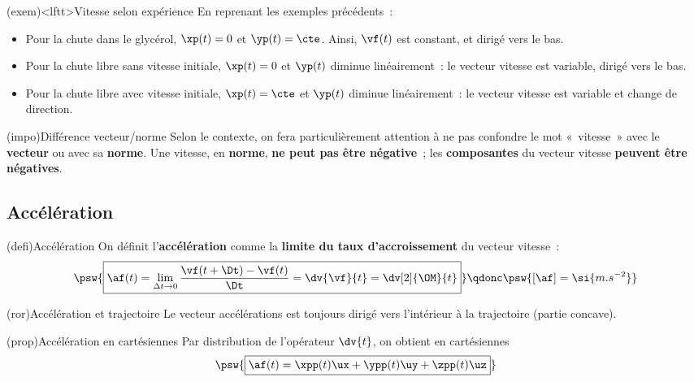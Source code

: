 \documentclass[../../main/main.tex]{subfiles}
\begin{document}
\begin{tcb}(exem)<lftt>{Vitesse selon expérience}
	En reprenant les exemples précédents~:
	\begin{itemize}
		\item Pour la chute dans le glycérol, $\xp(t) = 0$ et $\yp(t) = \cte$. Ainsi,
		      $\vf(t)$ est constant, et dirigé vers le bas.
		\item Pour la chute libre sans vitesse initiale, $\xp(t) = 0$ et $\yp(t)$
		      diminue linéairement~: le vecteur vitesse est variable, dirigé vers
		      le bas.
		\item Pour la chute libre avec vitesse initiale, $\xp(t) = \cte$ et $\yp(t)$
		      diminue linéairement~: le vecteur vitesse est variable et change de
		      direction.
	\end{itemize}
\end{tcb}

\begin{tcb}(impo){Différence vecteur/norme}
	Selon le contexte, on fera particulièrement attention à ne pas confondre le
	mot «~vitesse~» avec le \textbf{vecteur} ou avec sa \textbf{norme}. Une
	vitesse, en \textbf{norme}, \textbf{ne peut pas être négative}~; les
	\textbf{composantes} du vecteur vitesse \textbf{peuvent être négatives}.
\end{tcb}

\subsection{Accélération}
\begin{tcb}(defi){Accélération}
	On définit l'\textbf{accélération} comme la \textbf{limite du taux d'accroissement} du vecteur vitesse~:
	\[
		\psw{%
			\boxed{%
				\af(t) =
				\lim_{\Delta{t}\to 0} \frac{\vf(t+\Dt) - \vf(t)}{\Dt} =
				\dv{\vf}{t} =
				\dv[2]{\OM}{t}
			}%
		}%
		\qdonc
		\psw{[\af] = \si{m.s^{-2}}}
	\]
\end{tcb}

\begin{tcb}(ror){Accélération et trajectoire}
	Le vecteur accélérations est toujours dirigé vers l'intérieur à la
	trajectoire (partie concave).
\end{tcb}

\begin{tcb*}(prop){Accélération en cartésiennes}
	Par distribution de l'opérateur $\dv{t}$, on obtient en cartésiennes
	\[\psw{\boxed{\af(t) = \xpp(t)\ux + \ypp(t)\uy + \zpp(t)\uz}}\]
\end{tcb*}
\end{document}
